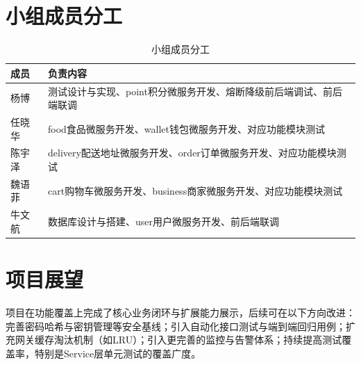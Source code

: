 \section{小组成员分工}

\begin{table}[H]
	\centering
	\caption{小组成员分工}
	\begin{tabular}{p{2.8cm}p{11.5cm}}
		\hline
		\textbf{成员} & \textbf{负责内容} \\
		\hline
		杨博 & 测试设计与实现、point积分微服务开发、熔断降级前后端调试、前后端联调 \\
		\hline
		任晓华 & food食品微服务开发、wallet钱包微服务开发、对应功能模块测试 \\
		\hline
		陈宇泽 & delivery配送地址微服务开发、order订单微服务开发、对应功能模块测试 \\
		\hline
		魏语菲 & cart购物车微服务开发、business商家微服务开发、对应功能模块测试 \\
		\hline
		牛文航 & 数据库设计与搭建、user用户微服务开发、前后端联调 \\
		\hline
	\end{tabular}
\end{table}

\section{项目展望}

项目在功能覆盖上完成了核心业务闭环与扩展能力展示，后续可在以下方向改进：完善密码哈希与密钥管理等安全基线；引入自动化接口测试与端到端回归用例；扩充网关缓存淘汰机制（如LRU）；引入更完善的监控与告警体系；持续提高测试覆盖率，特别是Service层单元测试的覆盖广度。
